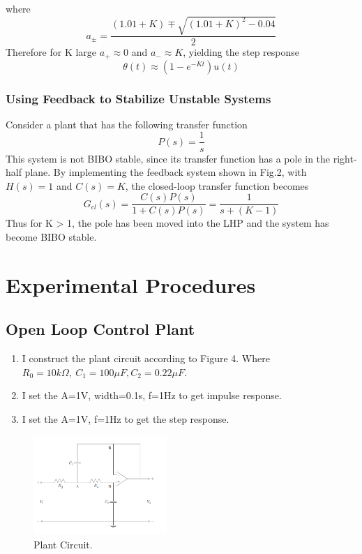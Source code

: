 \documentclass{article}
\begin{document}
{{{            where $$a_{\pm}=\frac{(1.01+K) \mp \sqrt{(1.01+K)^{2}-0.04}}{2}$$
            Therefore for K large $a_{+} \approx 0$ and $a_{-} \approx K$, yielding the step response 
            \begin{equation}
                \theta(t) \approx\left(1-e^{-K t}\right) u(t)
            \end{equation}
       }

       \subsubsection{Using Feedback to Stabilize Unstable Systems}
       {
           Consider a plant that has the following transfer function
            \begin{equation}
                P(s)=\frac{1}{s}
            \end{equation}
            This system is not BIBO stable, since its transfer function has a pole in the right-half plane. By implementing the feedback system shown in Fig.2, with $H(s) = 1$ and $C(s) = K$, the closed-loop transfer function becomes
            \begin{equation}
                G_{c l}(s)=\frac{C(s) P(s)}{1+C(s) P(s)}=\frac{1}{s+(K-1)}
            \end{equation}
            Thus for K > 1, the pole has been moved into the LHP and the system has become BIBO stable.
       }
    }
\section{Experimental Procedures}
{
    \subsection{Open Loop Control Plant}
    {
        \begin{enumerate}
            \item I construct the plant circuit according to Figure 4. Where $R_{0}= 10k\Omega,\ C_{1} = 100\mu F, C_{2} =0.22\mu F$.
            \item I set the A=1V, width=0.1s, f=1Hz to get impulse response.
            \item I set the A=1V, f=1Hz to get the step response.
        \end{enumerate}

        \begin{figure}[H]
            \centering
            \includegraphics[width=0.45\textwidth]{figures/lab3_4.png}
            \caption{Plant Circuit.}
            \label{fig:lab3_4}
        \end{figure}
    }
}}
\end{document}

